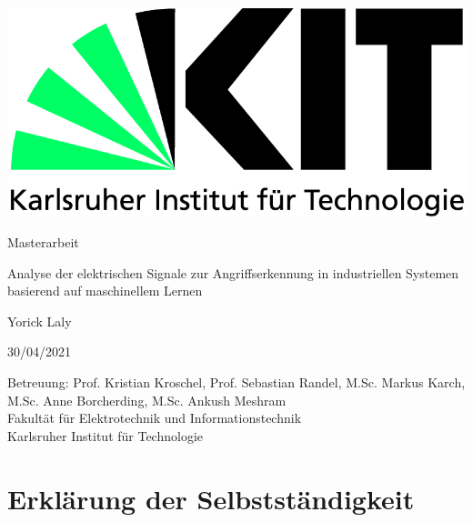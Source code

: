 \documentclass[12pt,a4paper]{scrartcl}
\numberwithin{equation}{section}
\begin{document}
  \pagestyle{empty}

  \begin{titlepage}

    \includegraphics[scale=0.45]{kit-logo.jpg}
    \vspace*{2cm} 

 \begin{center} \large 
    
    Masterarbeit
    \vspace*{2cm}

    {\huge Analyse der elektrischen Signale zur Angriffserkennung in industriellen Systemen basierend auf maschinellem Lernen}
    \vspace*{2.5cm}

    Yorick Laly
    \vspace*{1.5cm}

    30/04/2021
    \vspace*{4.5cm}


    Betreuung: Prof. Kristian Kroschel, Prof. Sebastian Randel, M.Sc. Markus Karch, M.Sc. Anne Borcherding, M.Sc. Ankush Meshram \\[0.7cm]
    Fakult\"at für Elektrotechnik und Informationstechnik \\[0.7cm]
		Karlsruher Institut für Technologie
  \end{center}
\end{titlepage}



 \newpage  %
  \pagestyle{headings}

\section*{Erklärung der Selbstständigkeit}
\end{document}
